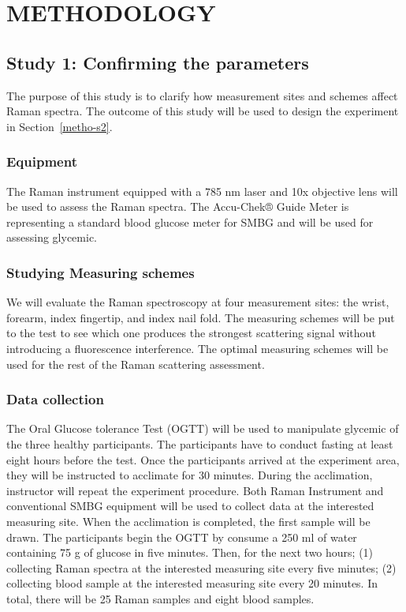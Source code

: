 \setlength{\footskip}{8mm}

\chapter{METHODOLOGY}\label{methodology}

\section{Study 1: Confirming the parameters}\label{metho-s1}

The purpose of this study is to clarify how measurement sites and schemes affect Raman spectra.
The outcome of this study will be used to design the experiment in Section~\ref{metho-s2}.

\subsection{Equipment}
The Raman instrument equipped with a 785 nm laser and 10x objective lens will be used to assess the Raman spectra.
The Accu-Chek® Guide Meter is representing a standard blood glucose meter for SMBG \citep{accu2022} and will be used for assessing glycemic.

\subsection{Studying Measuring schemes}
We will evaluate the Raman spectroscopy at four measurement sites: the wrist, forearm, index fingertip, and index nail fold.
The measuring schemes will be put to the test to see which one produces the strongest scattering signal without introducing a fluorescence interference.
The optimal measuring schemes will be used for the rest of the Raman scattering assessment.

\subsection{Data collection}
The Oral Glucose tolerance Test (OGTT) will be used to manipulate glycemic of the three healthy participants.
The participants have to conduct fasting at least eight hours before the test.
Once the participants arrived at the experiment area, they will be instructed to acclimate for 30 minutes.
During the acclimation, instructor will repeat the experiment procedure.
Both Raman Instrument and conventional SMBG equipment will be used to collect data at the interested measuring site.
When the acclimation is completed, the first sample will be drawn.
The participants begin the OGTT by consume a 250 ml of water containing 75 g of glucose in five minutes.
Then, for the next two hours;
(1) collecting Raman spectra at the interested measuring site every five minutes;
(2) collecting blood sample at the interested measuring site every 20 minutes.
In total, there will be 25 Raman samples and eight blood samples.

